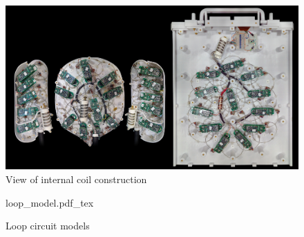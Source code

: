 \begin{figure}
\vspace{2.4in}
\includegraphics[width=6in]{figures/internals_composite.jpg}
\caption{View of internal coil construction}
\label{fig:internals_composite}
\end{figure}
\clearpage
\newpage

\begin{figure}
\vspace{2.4in}
{loop_model.pdf_tex}
\caption{Loop circuit models}
\label{fig:loop_model}
\end{figure}
\clearpage
\newpage
